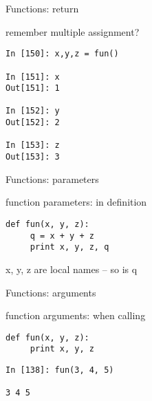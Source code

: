 \documentclass{beamer}
\begin{document}
\begin{frame}[fragile]{Functions: return}

{\Large remember multiple assignment?}

\begin{verbatim}
In [150]: x,y,z = fun()

In [151]: x
Out[151]: 1

In [152]: y
Out[152]: 2

In [153]: z
Out[153]: 3
\end{verbatim}

\end{frame}









\begin{frame}[fragile]{Functions: parameters}

{\Large function parameters: in definition}

\begin{verbatim}
def fun(x, y, z):
     q = x + y + z
     print x, y, z, q
\end{verbatim}

{\Large x, y, z are local names -- so is q}

\end{frame}

\begin{frame}[fragile]{Functions: arguments}

{\Large function arguments: when calling}

\begin{verbatim}
def fun(x, y, z):
     print x, y, z
\end{verbatim}
\begin{verbatim}
In [138]: fun(3, 4, 5)

3 4 5
\end{verbatim}

\end{frame}
\end{document}
